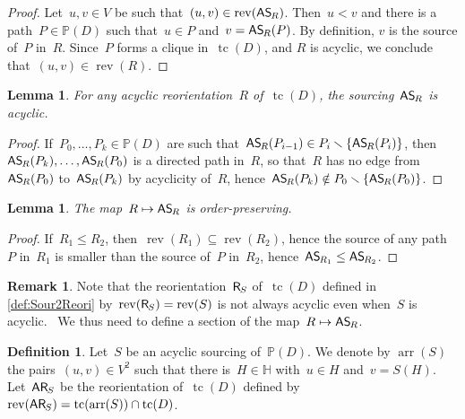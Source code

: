 \documentclass{amsart}
\newtheorem{lemma}[theorem]{Lemma}
\theoremstyle{definition}
\newtheorem{definition}[theorem]{Definition}
\newtheorem{remark}[theorem]{Remark}
\newcommand{\ssm}{\smallsetminus} %
\DeclareMathOperator{\tc}{tc} %
\newcommand{\vincent}[1]{\todo[size=\tiny,color=blue!30]{ #1 \\ \hfill --- V.}\,}
\newcommand{\mymap}[2]{\mathsf{#1}_{\hspace{-.7pt}#2}}
\newcommand{\reori}[1]{\mymap{R}{#1}}  %
\newcommand{\areori}[1]{\mymap{AR}{#1}}  %
\DeclareMathOperator{\rev}{rev} %
\newcommand{\asour}[1]{\mymap{AS}{#1}}  %
\DeclareMathOperator{\arr}{arr} %
\newcommand{\HH}{\mathbb H}  %
\newcommand{\PP}{\mathbb P} %
\begin{document}
\begin{proof}
Let~$u,v \in V$ be such that~$(u,v) \in \rev(\asour{R})$. 
Then~$u < v$ and there is a path~$P \in \PP(D)$ such that~$u \in P$ and~$v = \asour{R}(P)$.
By definition, $v$ is the source of~$P$ in~$R$.
Since~$P$ forms a clique in~$\tc(D)$, and $R$ is acyclic, we conclude that~$(u,v) \in \rev(R)$.
\end{proof}

\begin{lemma}
\label{lem:AReori2ASour2}
For any acyclic reorientation~$R$ of~$\tc(D)$, the sourcing~$\asour{R}$ is acyclic.
\end{lemma}

\begin{proof}
If~$P_0, \dots, P_k \in \PP(D)$ are such that~$\asour{R}(P_{i-1}) \in P_i \ssm \{\asour{R}(P_i)\}$, then~$\asour{R}(P_k), \dots, \asour{R}(P_0)$ is a directed path in~$R$, so that~$R$ has no edge from~$\asour{R}(P_0)$ to~$\asour{R}(P_k)$ by acyclicity of~$R$, hence~${\asour{R}(P_k) \notin P_0 \ssm \{\asour{R}(P_0)\}}$.
\end{proof}

\begin{lemma}
\label{lem:AReori2ASour3}
The map~$R \mapsto \asour{R}$ is order-preserving.
\end{lemma}

\begin{proof}
If~$R_1 \le R_2$, then~$\rev(R_1) \subseteq \rev(R_2)$, hence the source of any path~$P$ in~$R_1$ is smaller than the source of~$P$ in~$R_2$, hence~$\asour{R_1} \le \asour{R_2}$.
\end{proof}

\begin{remark}
Note that the reorientation~$\reori{S}$ of~$\tc(D)$ defined in \cref{def:Sour2Reori} by~$\rev(\reori{S}) = \rev(S)$ is not always acyclic even when~$S$ is acyclic.
\vincent{todo}
We thus need to define a section of the map~$R \mapsto \asour{R}$.
\end{remark}

\begin{definition}
\label{def:ASour2AReori}
Let~$S$ be an acyclic sourcing of~$\PP(D)$.
We denote by $\arr(S)$ the pairs~$(u,v) \in V^2$ such that there is~$H \in \HH$ with~$u \in H$ and~$v = S(H)$.
Let~$\areori{S}$ be the reorientation of~$\tc(D)$ defined by~$\rev(\areori{S}) = \tc(\arr(S)) \cap \tc(D)$.
\end{definition}
\end{document}
